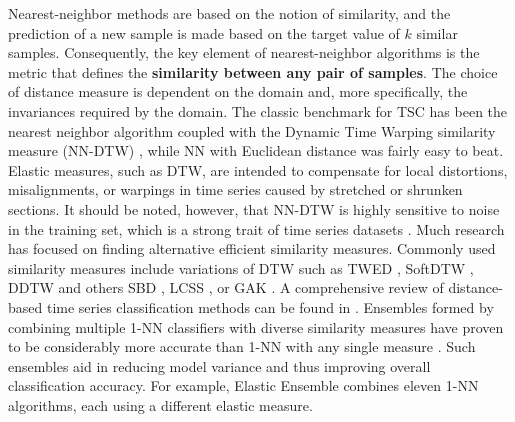 Nearest-neighbor methods are based on the notion of similarity, and the prediction of a new sample is made based on the target value of $k$ similar samples.
Consequently, the key element of nearest-neighbor algorithms is the metric that defines the \textbf{similarity between any pair of samples}.
The choice of distance measure is dependent on the domain and, more specifically, the invariances required by the domain. 
The classic benchmark for TSC has been the nearest neighbor algorithm coupled with the Dynamic Time Warping similarity measure (NN-DTW) \cite{bagnall2017great}, while NN with Euclidean distance was fairly easy to beat.  Elastic measures, such as DTW, are intended to compensate for local distortions, misalignments, or warpings in time series caused by stretched or shrunken sections. It should be noted, however, that NN-DTW is highly sensitive to noise in the training set, which is a strong trait of time series datasets \cite{abanda2019review}.
Much research has focused on finding alternative efficient similarity measures. Commonly used similarity measures include variations of DTW such as TWED \cite{marteau2008time}, SoftDTW \cite{cuturi2017soft}, DDTW \cite{keogh2001derivative} and others SBD \cite{paparrizos2017fast}, LCSS \cite{vlachos2002discovering}, or GAK \cite{cuturi2011fast}. A comprehensive review of distance-based time series classification methods can be found in \cite{abanda2019review}. 
Ensembles formed by combining multiple 1-NN classifiers with diverse similarity measures have proven to be considerably more accurate than 1-NN with any single measure \cite{bagnall2015time}. Such ensembles aid in reducing model variance and thus improving overall classification accuracy. 
For example, Elastic Ensemble \cite{bagnall2015time} combines eleven 1-NN algorithms, each using a different elastic measure.




